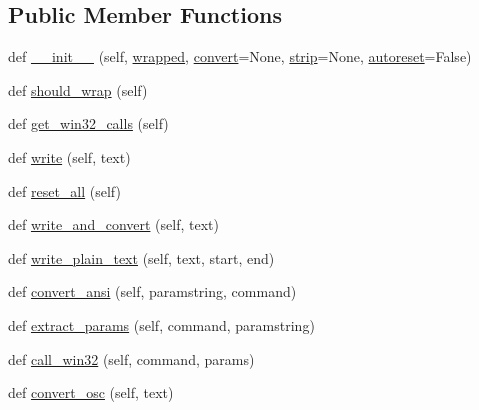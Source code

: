 \subsection*{Public Member Functions}
\begin{DoxyCompactItemize}
\item 
def \hyperlink{classpip_1_1__vendor_1_1colorama_1_1ansitowin32_1_1AnsiToWin32_afc7686f1c08c51ce173f25bd32135fdb}{\+\_\+\+\_\+init\+\_\+\+\_\+} (self, \hyperlink{classpip_1_1__vendor_1_1colorama_1_1ansitowin32_1_1AnsiToWin32_a34af25ac3c344b7b7c022e659c320f53}{wrapped}, \hyperlink{classpip_1_1__vendor_1_1colorama_1_1ansitowin32_1_1AnsiToWin32_a93dc9a71774f9f8e323c8b89478da717}{convert}=None, \hyperlink{classpip_1_1__vendor_1_1colorama_1_1ansitowin32_1_1AnsiToWin32_a6f241d452547c3d8f90d0b786223d21b}{strip}=None, \hyperlink{classpip_1_1__vendor_1_1colorama_1_1ansitowin32_1_1AnsiToWin32_aca16010cfb73f29db60437346f928489}{autoreset}=False)
\item 
def \hyperlink{classpip_1_1__vendor_1_1colorama_1_1ansitowin32_1_1AnsiToWin32_a3414c7ec2cb2605822986d95cb1d1831}{should\+\_\+wrap} (self)
\item 
def \hyperlink{classpip_1_1__vendor_1_1colorama_1_1ansitowin32_1_1AnsiToWin32_a43dffa1a66cd76293ab2e47b4504c7bd}{get\+\_\+win32\+\_\+calls} (self)
\item 
def \hyperlink{classpip_1_1__vendor_1_1colorama_1_1ansitowin32_1_1AnsiToWin32_aa62e555eeb1742f0060b85b18cf85dd9}{write} (self, text)
\item 
def \hyperlink{classpip_1_1__vendor_1_1colorama_1_1ansitowin32_1_1AnsiToWin32_afc06570c8300238d5feedbd4e60597ae}{reset\+\_\+all} (self)
\item 
def \hyperlink{classpip_1_1__vendor_1_1colorama_1_1ansitowin32_1_1AnsiToWin32_ad722f312c277b0b7dd5af9ce411d2b8c}{write\+\_\+and\+\_\+convert} (self, text)
\item 
def \hyperlink{classpip_1_1__vendor_1_1colorama_1_1ansitowin32_1_1AnsiToWin32_aa914722156e152368d73c19982726ce6}{write\+\_\+plain\+\_\+text} (self, text, start, end)
\item 
def \hyperlink{classpip_1_1__vendor_1_1colorama_1_1ansitowin32_1_1AnsiToWin32_ac7c8287fb20a3935cd14a125640fde95}{convert\+\_\+ansi} (self, paramstring, command)
\item 
def \hyperlink{classpip_1_1__vendor_1_1colorama_1_1ansitowin32_1_1AnsiToWin32_a4861073b74dd6115cd31dcb890179bc0}{extract\+\_\+params} (self, command, paramstring)
\item 
def \hyperlink{classpip_1_1__vendor_1_1colorama_1_1ansitowin32_1_1AnsiToWin32_a4c2d1ac2d58f37344273402e51ba4c09}{call\+\_\+win32} (self, command, params)
\item 
def \hyperlink{classpip_1_1__vendor_1_1colorama_1_1ansitowin32_1_1AnsiToWin32_a6ad7fe3d2c5dd9ca1108f1f4b70f85b0}{convert\+\_\+osc} (self, text)
\end{DoxyCompactItemize}
